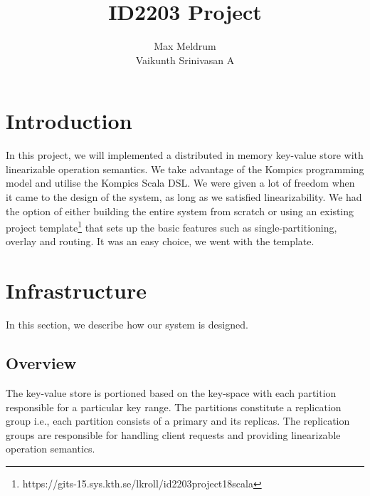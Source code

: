 \documentclass[12pt]{article}
\title{\textbf{ID2203 Project}}
\author{Max Meldrum\\
	Vaikunth Srinivasan A}
\date{}
\begin{document}
\maketitle

\section{Introduction}
In this project, we will implemented a distributed in memory key-value store with linearizable operation semantics. We take advantage of the Kompics \cite{DBLP:conf/p2p/AradDH09} programming model and utilise the Kompics Scala DSL. We were given a lot of freedom when it came to the design of the system, as long as we satisfied linearizability. We had the option of either building the entire system from scratch or using an existing project template\footnote{https://gits-15.sys.kth.se/lkroll/id2203project18scala} that sets up the basic features such as single-partitioning, overlay and routing. It was an easy choice, we went with the template.

\section{Infrastructure}
In this section, we describe how our system is designed.

\subsection{Overview}

The key-value store is portioned based on the key-space with each partition responsible for a particular key range. The partitions constitute a replication group i.e., each partition consists of a primary and its replicas. The replication groups are responsible for handling client requests and providing linearizable operation semantics.
\end{document}
